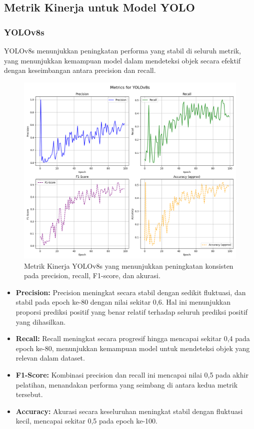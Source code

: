 \documentclass[12pt,a4paper]{article}
\begin{document}
\subsection{Metrik Kinerja untuk Model YOLO}

\subsubsection{YOLOv8s}
YOLOv8s menunjukkan peningkatan performa yang stabil di seluruh metrik, yang menunjukkan kemampuan model dalam mendeteksi objek secara efektif dengan keseimbangan antara precision dan recall.  

\begin{figure}[H]
    \centering
    \includegraphics[width=0.6\linewidth]{assets/yolov8s_metrics.png}
    \caption{Metrik Kinerja YOLOv8s yang menunjukkan peningkatan konsisten pada precision, recall, F1-score, dan akurasi.}
    \label{fig:yolov8s}
\end{figure}

\begin{itemize}
    \item \textbf{Precision:} Precision meningkat secara stabil dengan sedikit fluktuasi, dan stabil pada epoch ke-80 dengan nilai sekitar 0,6. Hal ini menunjukkan proporsi prediksi positif yang benar relatif terhadap seluruh prediksi positif yang dihasilkan.
    \item \textbf{Recall:} Recall meningkat secara progresif hingga mencapai sekitar 0,4 pada epoch ke-80, menunjukkan kemampuan model untuk mendeteksi objek yang relevan dalam dataset.
    \item \textbf{F1-Score:} Kombinasi precision dan recall ini mencapai nilai 0,5 pada akhir pelatihan, menandakan performa yang seimbang di antara kedua metrik tersebut.
    \item \textbf{Accuracy:} Akurasi secara keseluruhan meningkat stabil dengan fluktuasi kecil, mencapai sekitar 0,5 pada epoch ke-100.
\end{itemize}
\end{document}
